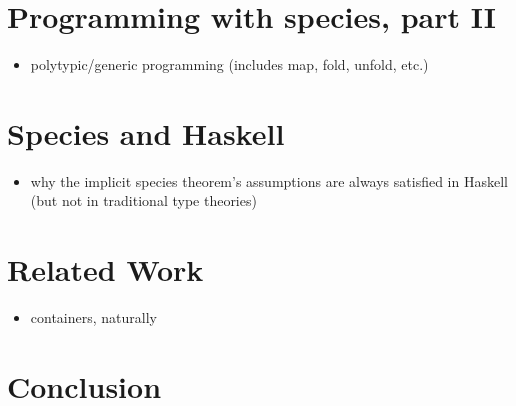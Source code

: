 \documentclass[9pt]{sigplanconf}
\begin{document}
\section{Programming with species, part II}\label{sec:prog2}
\begin{itemize}
\item polytypic/generic programming (includes map, fold, unfold, etc.)
\end{itemize}

\section{Species and Haskell}\label{sec:haskell}
\begin{itemize}
\item why the implicit species theorem's assumptions are always satisfied in Haskell (but not in traditional type theories)
\end{itemize}

\section{Related Work}\label{sec:related}
\begin{itemize}
\item containers, naturally
\end{itemize}

\section{Conclusion}\label{sec:conclusion}

%
%
\end{document}
